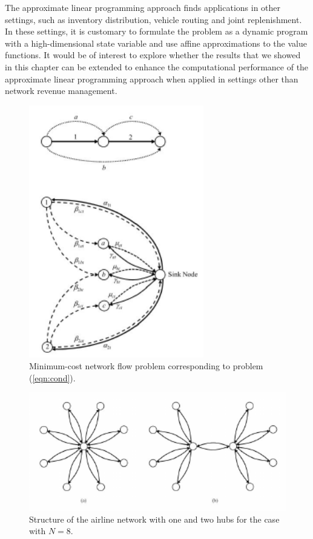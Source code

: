 The approximate linear programming approach finds applications in other settings, such as inventory distribution, vehicle routing and joint replenishment. In these settings, it is customary to formulate the problem as a dynamic program with a high-dimensional state variable and use affine approximations to the value functions. It would be of interest to explore whether the results that we showed in this chapter can be extended to enhance the computational performance of the approximate linear programming approach when applied in settings other than network revenue management.\\

\begin{figure}
\begin{center}
\includegraphics[width=3in]{chap1/figures/mincost.pdf}
\caption{Minimum-cost network flow problem corresponding to problem (\ref{eqn:cond}).}
\end{center}
\end{figure}


\begin{figure}
\begin{center}
\includegraphics[width=6in]{chap1/figures/network.pdf}
\caption{Structure of the airline network with one and two hubs for the case with $N=8$.}
\label{fig:network}

\end{center}
\end{figure}

